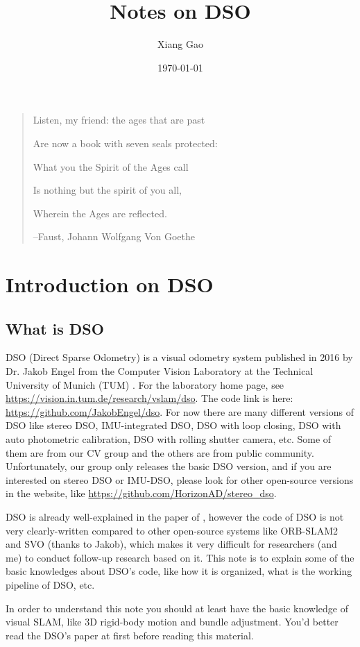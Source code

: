 \documentclass[a4paper,10pt]{article}
\title{Notes on DSO}
\author{Xiang Gao}
\date{\today}
\begin{document}
	\maketitle
	
	\begin{quotation}
		\centering
		Listen, my friend: the ages that are past
		
		Are now a book with seven seals protected:
		
		What you the Spirit of the Ages call
		
		Is nothing but the spirit of you all,
		
		Wherein the Ages are reflected.
		
		--Faust, Johann Wolfgang Von Goethe
	\end{quotation}
	
	\section{Introduction on DSO}
	\subsection{What is DSO}
	DSO (Direct Sparse Odometry) is a visual odometry system published in 2016 by Dr. Jakob Engel from the Computer Vision Laboratory at the Technical University of Munich (TUM) \cite{engel2018direct}. For the laboratory home page, see \url{https://vision.in.tum.de/research/vslam/dso}. The code link is here: \url{https://github.com/JakobEngel/dso}. For now there are many different versions of DSO like stereo DSO, IMU-integrated DSO, DSO with loop closing, DSO with auto photometric calibration, DSO with rolling shutter camera, etc. Some of them are from our CV group and the others are from public community. Unfortunately, our group only releases the basic DSO version, and if you are interested on stereo DSO or IMU-DSO, please look for other open-source versions in the website, like \url{https://github.com/HorizonAD/stereo_dso}. 

	DSO is already well-explained in the paper of \cite{engel2018direct}, however the code of DSO is not very clearly-written compared to other open-source systems like ORB-SLAM2 and SVO (thanks to Jakob), which makes it very difficult for researchers (and me) to conduct follow-up research based on it. This note is to explain some of the basic knowledges about DSO's code, like how it is organized, what is the working pipeline of DSO, etc. 
	
	In order to understand this note you should at least have the basic knowledge of visual SLAM, like 3D rigid-body motion and bundle adjustment. You'd better read the DSO's paper at first before reading this material.
	
\end{document}
